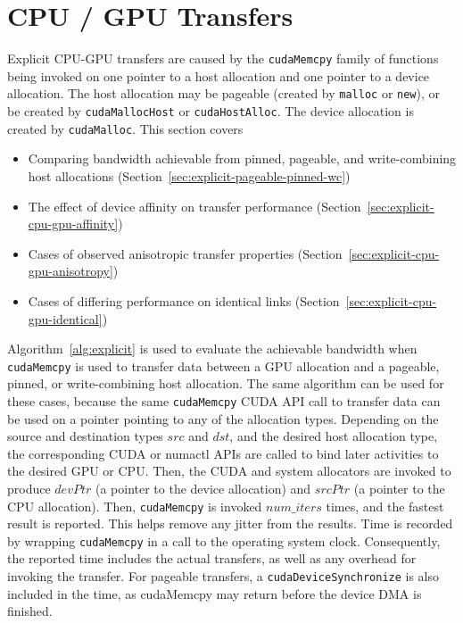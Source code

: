 \section{CPU / GPU Transfers}
\label{sec:explicit-cpu-gpu}

Explicit CPU-GPU transfers are caused by the \texttt{cudaMemcpy} family of functions being invoked on one pointer to a host allocation and one pointer to a device allocation.
The host allocation may be pageable (created by \texttt{malloc} or \texttt{new}), or be created by \texttt{cudaMallocHost} or \texttt{cudaHostAlloc}.
The device allocation is created by \texttt{cudaMalloc}.
This section covers
\begin{itemize}
\item Comparing bandwidth achievable from pinned, pageable, and write-combining host allocations (Section~\ref{sec:explicit-pageable-pinned-wc})
\item The effect of device affinity on transfer performance (Section~\ref{sec:explicit-cpu-gpu-affinity})
\item Cases of observed anisotropic transfer properties (Section~\ref{sec:explicit-cpu-gpu-anisotropy})
\item Cases of differing performance on identical links (Section~\ref{sec:explicit-cpu-gpu-identical})
\end{itemize}

Algorithm~\ref{alg:explicit} is used to evaluate the achievable bandwidth when \texttt{cudaMemcpy} is used to transfer data between a GPU allocation and a pageable, pinned, or write-combining host allocation. 
The same algorithm can be used for these cases, because the same \texttt{cudaMemcpy} CUDA API call to transfer data can be used on a pointer pointing to any of the allocation types.
Depending on the source and destination types $src$ and $dst$, and the desired host allocation type, the corresponding CUDA or numactl APIs are called to bind later activities to the desired GPU or CPU.
Then, the CUDA and system allocators are invoked to produce $devPtr$ (a pointer to the device allocation) and $srcPtr$ (a pointer to the CPU allocation).
Then, \texttt{cudaMemcpy} is invoked $num\_iters$ times, and the fastest result is reported.
This helps remove any jitter from the results.
Time is recorded by wrapping \texttt{cudaMemcpy} in a call to the operating system clock.
Consequently, the reported time includes the actual transfers, as well as any overhead for invoking the transfer.
For pageable transfers, a \texttt{cudaDeviceSynchronize} is also included in the time, as cudaMemcpy may return before the device DMA is finished.


